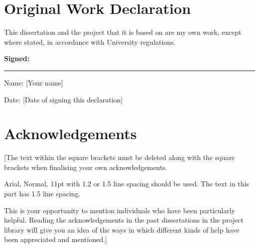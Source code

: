 \chapter*{Original Work Declaration}
\thispagestyle{fancy} %


This dissertation and the project that it is based on are my own work, except where stated, in accordance with University regulations.

\vspace{12pt}
\textbf{Signed:}
\hrule width 0.7\textwidth
\vspace{12pt}

Name: [Your name]
\vspace{3pt}

Date: [Date of signing this declaration]



\chapter*{Acknowledgements}
\thispagestyle{fancy} %

[The text within the square brackets must be deleted along with the square brackets when finalising your own acknowledgements.

Arial, Normal, 11pt with 1.2 or 1.5 line spacing should be used. The text in this part has 1.5 line spacing.

This is your opportunity to mention individuals who have been particularly helpful. Reading the acknowledgements in the past dissertations in the project library will give you an idea of the ways in which different kinds of help have been appreciated and mentioned.]
